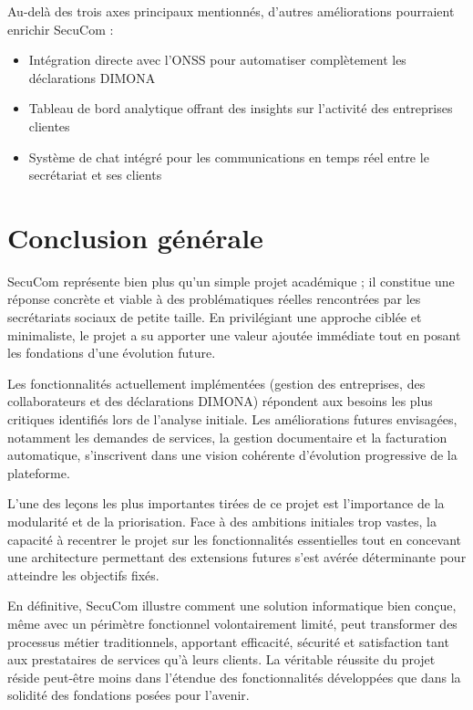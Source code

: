 \documentclass[12pt,a4paper]{report}
\begin{document}
Au-delà des trois axes principaux mentionnés, d'autres améliorations pourraient enrichir SecuCom :

\begin{itemize}
  \item Intégration directe avec l'ONSS pour automatiser complètement les déclarations DIMONA
  \item Tableau de bord analytique offrant des insights sur l'activité des entreprises clientes
  \item Système de chat intégré pour les communications en temps réel entre le secrétariat et ses clients
\end{itemize}

\section*{Conclusion générale}

SecuCom représente bien plus qu'un simple projet académique ; il constitue une réponse concrète et viable à des problématiques réelles rencontrées par les secrétariats sociaux de petite taille. En privilégiant une approche ciblée et minimaliste, le projet a su apporter une valeur ajoutée immédiate tout en posant les fondations d'une évolution future.

Les fonctionnalités actuellement implémentées (gestion des entreprises, des collaborateurs et des déclarations DIMONA) répondent aux besoins les plus critiques identifiés lors de l'analyse initiale. Les améliorations futures envisagées, notamment les demandes de services, la gestion documentaire et la facturation automatique, s'inscrivent dans une vision cohérente d'évolution progressive de la plateforme.

L'une des leçons les plus importantes tirées de ce projet est l'importance de la modularité et de la priorisation. Face à des ambitions initiales trop vastes, la capacité à recentrer le projet sur les fonctionnalités essentielles tout en concevant une architecture permettant des extensions futures s'est avérée déterminante pour atteindre les objectifs fixés.

En définitive, SecuCom illustre comment une solution informatique bien conçue, même avec un périmètre fonctionnel volontairement limité, peut transformer des processus métier traditionnels, apportant efficacité, sécurité et satisfaction tant aux prestataires de services qu'à leurs clients. La véritable réussite du projet réside peut-être moins dans l'étendue des fonctionnalités développées que dans la solidité des fondations posées pour l'avenir.
\end{document}
